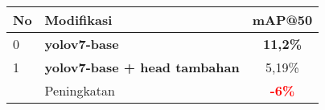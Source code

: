 \begin{table}[H]
  \centering
  \label{tbl:addhead}
  \vspace{-1ex}
  \begin{tabular}{ l l c }
    \toprule[1.5pt]
    No & Modifikasi                                 &mAP@50 \\
    \midrule
    0  & \textbf{yolov7-base}                       & \textbf{11,2\%}\\
    1  & \textbf{yolov7-base + head tambahan}       & 5,19\%\\
    \midrule
       & Peningkatan                                & \textbf{\textcolor{red}{-6\%}}\\
    \bottomrule[1.5pt]
  \end{tabular}
\end{table}